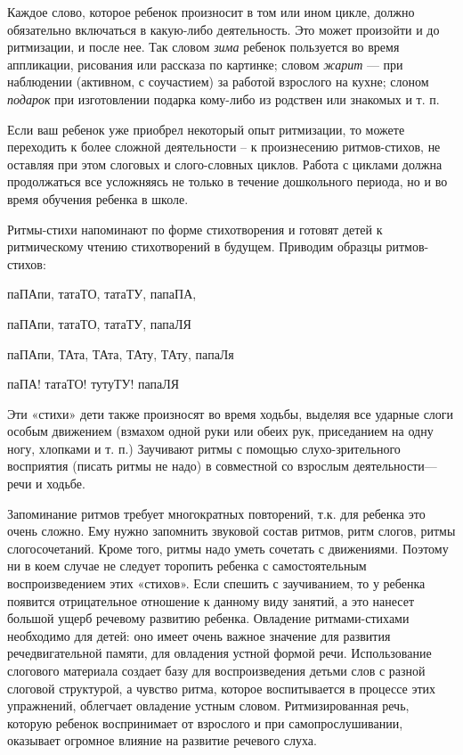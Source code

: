 \documentclass[a5paper]{book}
\renewcommand{\emph}[1]{\textit{#1}}
\begin{document}
Каждое слово, которое ребенок произносит в том или ином цикле, должно
обязательно включаться в какую-либо деятельность. Это может произойти и
до ритмизации, и после нее. Так словом \emph{зима} ребенок пользуется во
время аппликации, рисования или рассказа по картинке; словом
\emph{жарит} --- при наблюдении (активном, с соучастием) за работой
взрослого на кухне; слоном \emph{подарок} при изготовлении подарка
кому-либо из родствен или знакомых и т. п.

Если ваш ребенок уже приобрел некоторый опыт ритмизации, то можете
переходить к более сложной деятельности -- к произнесению ритмов-стихов,
не оставляя при этом слоговых и слого-словных циклов. Работа с циклами
должна продолжаться все усложняясь не только в течение дошкольного
периода, но и во время обучения ребенка в школе.

Ритмы-стихи напоминают по форме стихотворения и готовят детей к
ритмическому чтению стихотворений в будущем. Приводим образцы
ритмов-стихов:

паПАпи, татаТО, татаТУ, папаПА,

паПАпи, татаТО, татаТУ, папаЛЯ

паПАпи, ТАта, ТАта, ТАту, ТАту, папаЛя

паПА! татаТО! тутуТУ! папаЛЯ

Эти «стихи» дети также произносят во время ходьбы, выделяя все ударные
слоги особым движением (взмахом одной руки или обеих рук, приседанием на
одну ногу, хлопками и т. п.) Заучивают ритмы с помощью слухо-зрительного
восприятия (писать ритмы не надо) в совместной со взрослым
деятельности---речи и ходьбе.

Запоминание ритмов требует многократных повторений, т.к. для ребенка это
очень сложно. Ему нужно запомнить звуковой состав ритмов, ритм слогов,
ритмы слогосочетаний. Кроме того, ритмы надо уметь сочетать с
движениями. Поэтому ни в коем случае не следует торопить ребенка с
самостоятельным воспроизведением этих «стихов». Если спешить с
заучиванием, то у ребенка появится отрицательное отношение к данному
виду занятий, а это нанесет большой ущерб речевому развитию ребенка.
Овладение ритмами-стихами необходимо для детей: оно имеет очень важное
значение для развития речедвигательной памяти, для овладения устной
формой речи. Использование слогового материала создает базу для
воспроизведения детьми слов с разной слоговой структурой, а чувство
ритма, которое воспитывается в процессе этих упражнений, облегчает
овладение устным словом. Ритмизированная речь, которую ребенок
воспринимает от взрослого и при самопрослушивании, оказывает огромное
влияние на развитие речевого слуха.
\end{document}
